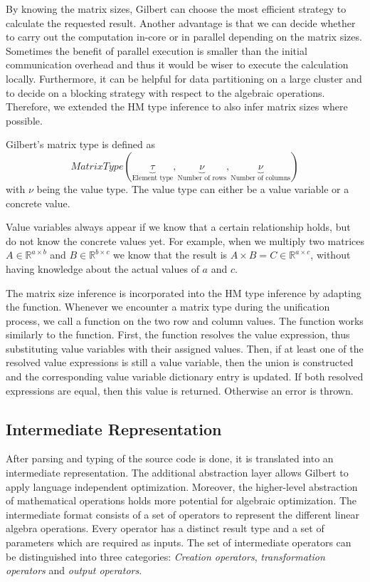 By knowing the matrix sizes, Gilbert can choose the most efficient strategy to calculate the requested result.
Another advantage is that we can decide whether to carry out the computation in-core or in parallel depending on the matrix sizes.
Sometimes the benefit of parallel execution is smaller than the initial communication overhead and thus it would be wiser to execute the calculation locally.
Furthermore, it can be helpful for data partitioning on a large cluster and to decide on a blocking strategy with respect to the algebraic operations.
Therefore, we extended the HM type inference to also infer matrix sizes where possible.

Gilbert's matrix type is defined as 
\begin{displaymath}
MatrixType(\underbrace{\tau}_{\text{Element type}},\underbrace{\nu}_{\text{Number of rows}},\underbrace{\nu}_{\text{Number of columns}})
\end{displaymath}
with $\nu$ being the value type. The value type can either be a value variable or a concrete value.

Value variables always appear if we know that a certain relationship holds, but do not know the concrete values yet.
For example, when we multiply two matrices $A\in\mathbb{R}^{a\times b}$ and $B\in\mathbb{R}^{b\times c}$ we know that the result is $A\times B = C \in \mathbb{R}^{a\times c}$, without having knowledge about the actual values of $a$ and $c$.

The matrix size inference is incorporated into the HM type inference by adapting the  function.
Whenever we encounter a matrix type during the unification process, we call a  function on the two row and column values.
The  function works similarly to the  function.
First, the function resolves the value expression, thus substituting value variables with their assigned values.
Then, if at least one of the resolved value expressions is still a value variable, then the union is constructed and the corresponding value variable dictionary entry is updated.
If both resolved expressions are equal, then this value is returned. 
Otherwise an error is thrown.

\subsection{Intermediate Representation}
\label{sec:intermediaterepresentation}

After parsing and typing of the source code is done, it is translated into an intermediate representation. 
The additional abstraction layer allows Gilbert to apply language independent optimization.
Moreover, the higher-level abstraction of mathematical operations holds more potential for algebraic optimization. 
The intermediate format consists of a set of operators to represent the different linear algebra operations. 
Every operator has a distinct result type and a set of parameters which are required as inputs. 
The set of intermediate operators can be distinguished into three categories: \emph{Creation operators}, \emph{transformation operators} and \emph{output operators}.

